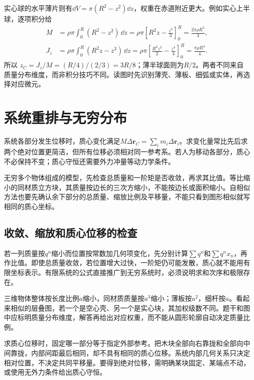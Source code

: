 实心球的水平薄片则有$\dd V=\pi(R^2-z^2)\dd z$，权重在赤道附近更大。例如实心上半球，逐项积分给
\begin{align*}
M&=\rho\pi\int_0^R(R^2-z^2)\,\dd z
=\rho\pi\left[R^2z-\frac{z^3}{3}\right]_0^R
=\frac{2\pi\rho R^3}{3},\\
J_z&=\rho\pi\int_0^R(R^2z-z^3)\,\dd z
=\rho\pi\left[\frac{R^2z^2}{2}-\frac{z^4}{4}\right]_0^R
=\frac{\pi\rho R^4}{4}.
\end{align*}
所以 $z_C=J_z/M=(R/4)/(2/3)=3R/8$；薄半球面则为$R/2$。两者不同来自质量分布维度，而非积分技巧不同。读图时先识别薄壳、薄板、细弧或实体，再选择对应微元。


\section{系统重排与无穷分布}
系统各部分发生位移时，质心变化满足$M\Delta\boldsymbol r_C=\sum_i m_i\Delta\boldsymbol r_i$。求变化量常比先后求两个绝对位置更简洁，但所有位移必须相对同一参考系。若人为移动各部分，质心不必保持不变；质心守恒还需要外力冲量等动力学条件。

无穷多个物体组成的模型，先检查总质量和一阶矩是否收敛，再求其比值。等比缩小的同材质立方块，其质量按边长的三次方缩小，不能按边长或面积缩小。自相似方法也要先确认余下部分的总质量、缩放比例及平移量，不能只看到图形相似就写相同的质心坐标。

\subsection{收敛、缩放和质心位移的检查}
若一列质量按$q^n$缩小而位置按常数加几何项变化，先分别计算$\sum q^n$和$\sum q^nx_n$，再作比值。即使总质量收敛，若位置增大过快，一阶矩仍可能发散，质心就不能用有限坐标表示。有限系统的公式直接推广到无穷系统时，必须说明求和次序和极限存在。

三维物体整体按长度比例$a$缩小，同材质质量按$a^3$缩小；薄板按$a^2$，细杆按$a$。看起来相似的层叠图，若一个是空心壳、另一个是实心块，其加权级数不同。题干和图中应标明质量分布维度，解答再给出对应权重，而不能从圆形轮廓自动决定质量比例。

求质心位移时，固定哪一部分等于指定外部参考。把木块全部向右靠拢和全部向中间靠拢，内部间距最后相同，却不具有相同的质心位移。系统内部几何关系只决定相对位置，不决定共同平移量。要得到绝对位移，需明确某块固定、某端点不动，或使用无外力条件给出质心守恒。


